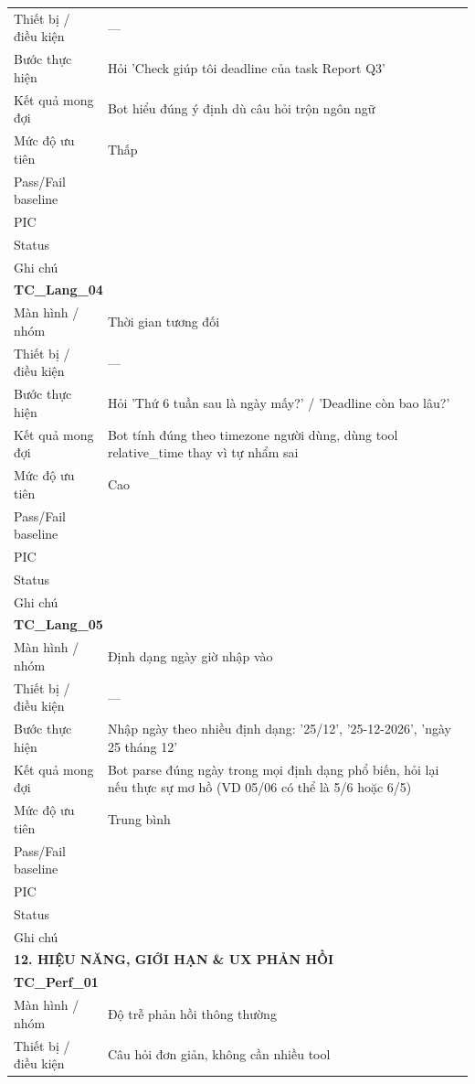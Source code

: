\documentclass[12pt,a4paper]{article}
\begin{document}
\begin{longtable}{p{3.0cm}p{11.5cm}}
Thiết bị / điều kiện & — \\
Bước thực hiện & Hỏi 'Check giúp tôi deadline của task Report Q3' \\
Kết quả mong đợi & Bot hiểu đúng ý định dù câu hỏi trộn ngôn ngữ \\
Mức độ ưu tiên & Thấp \\
Pass/Fail baseline &  \\
PIC &  \\
Status &  \\
Ghi chú &  \\
\midrule
\multicolumn{2}{l}{\textbf{TC\_Lang\_04}} \\
Màn hình / nhóm & Thời gian tương đối \\
Thiết bị / điều kiện & — \\
Bước thực hiện & Hỏi 'Thứ 6 tuần sau là ngày mấy?' / 'Deadline còn bao lâu?' \\
Kết quả mong đợi & Bot tính đúng theo timezone người dùng, dùng tool relative\_time thay vì tự nhẩm sai \\
Mức độ ưu tiên & Cao \\
Pass/Fail baseline &  \\
PIC &  \\
Status &  \\
Ghi chú &  \\
\midrule
\multicolumn{2}{l}{\textbf{TC\_Lang\_05}} \\
Màn hình / nhóm & Định dạng ngày giờ nhập vào \\
Thiết bị / điều kiện & — \\
Bước thực hiện & Nhập ngày theo nhiều định dạng: '25/12', '25-12-2026', 'ngày 25 tháng 12' \\
Kết quả mong đợi & Bot parse đúng ngày trong mọi định dạng phổ biến, hỏi lại nếu thực sự mơ hồ (VD 05/06 có thể là 5/6 hoặc 6/5) \\
Mức độ ưu tiên & Trung bình \\
Pass/Fail baseline &  \\
PIC &  \\
Status &  \\
Ghi chú &  \\
\midrule
\multicolumn{2}{l}{\textbf{12. HIỆU NĂNG, GIỚI HẠN \& UX PHẢN HỒI}} \\ \midrule
\multicolumn{2}{l}{\textbf{TC\_Perf\_01}} \\
Màn hình / nhóm & Độ trễ phản hồi thông thường \\
Thiết bị / điều kiện & Câu hỏi đơn giản, không cần nhiều tool \\

\end{longtable}
\end{document}

